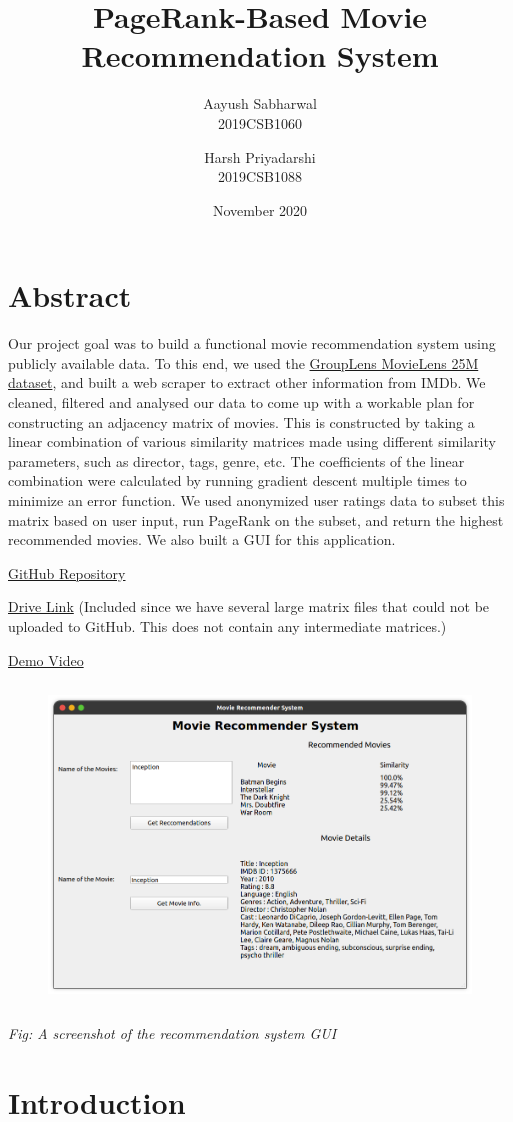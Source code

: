 \documentclass[11pt]{article}
\title{PageRank-Based Movie Recommendation System}
\author{
        Aayush Sabharwal\\
        2019CSB1060
        \and
        Harsh Priyadarshi\\
        2019CSB1088
    }
\date{November 2020}
\begin{document}
    
    \maketitle
    
    

    
    \hypertarget{abstract}{%
\section{Abstract}\label{abstract}}

Our project goal was to build a functional movie recommendation system
using publicly available data. To this end, we used the
\href{https://grouplens.org/datasets/movielens/}{GroupLens MovieLens 25M
dataset}, and built a web scraper to extract other information from
IMDb. We cleaned, filtered and analysed our data to come up with a
workable plan for constructing an adjacency matrix of movies. This is
constructed by taking a linear combination of various similarity
matrices made using different similarity parameters, such as director,
tags, genre, etc. The coefficients of the linear combination were
calculated by running gradient descent multiple times to minimize an
error function. We used anonymized user ratings data to subset this
matrix based on user input, run PageRank on the subset, and return the
highest recommended movies. We also built a GUI for this application.

\href{https://github.com/AayushSabharwal/recommender-system}{GitHub
Repository}

\href{https://drive.google.com/file/d/1e2L14HxKfuI4LJUIBTAo6CSgmtm1x7se/view?usp=sharing}{Drive
Link} (Included since we have several large matrix files that could not
be uploaded to GitHub. This does not contain any intermediate matrices.)

\href{https://youtu.be/CDz3vVZKoCM}{Demo Video}

\begin{figure}
    \centering
    \includegraphics[height=8.5cm]{gui.png}
\end{figure}
\begin{center}
    \textit{Fig: A screenshot of the recommendation system GUI}
\end{center}
    \hypertarget{introduction}{%
\section{Introduction}\label{introduction}}
\end{document}
